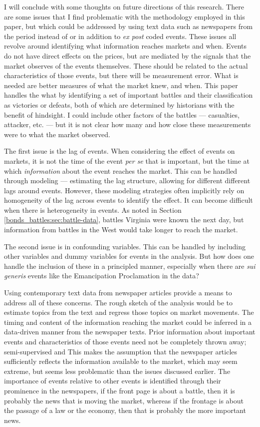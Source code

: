 I will conclude with some thoughts on future directions of this research.
There are some issues that I find problematic with the methodology employed in this paper, but which could be addressed by using text data such as newspapers from the period instead of or in addition to \textit{ex post} coded events.
These issues all revolve around identifying what information reaches markets and when. 
Events do not have direct effects on the prices, but are mediated by the signals that the market observes of the events themselves.
These should be related to the actual characteristics of those events, but there will be measurement error.
What is needed are better measures of what the market knew, and when.
This paper handles the what by identifying a set of important battles and their classification as victories or defeats, both of which are determined by historians with the benefit of hindsight.
I could include other factors of the battles --- casualties, attacker, etc. --- but it is not clear how many and how close these measurements were to what the market observed.

The first issue is the lag of events.
  When considering the effect of events on markets, it is not the time of the event \textit{per se} that is important, but the time at which \textit{information} about the event reaches the market.
  This can be handled through modeling --- \eg{}estimating the lag structure, allowing for different different lags around events.
  However, these modeling strategies often implicitly rely on homogeneity of the lag across events to identify the effect.
  It can become difficult when there is heterogeneity in events.
  As noted in Section \ref{bonds_battles:sec:battle-data}, battles Virginia were known the next day, but information from battles in the West would take longer to reach the market.

The second issue is in confounding variables.
  This can be handled by including other variables and dummy variables for events in the analysis.
  But how does one handle the inclusion of these in a principled manner, especially when there are \textit{sui generis} events like the Emancipation Proclamation in the data?

Using contemporary text data from newspaper articles provide a means to address all of these concerns.
The rough sketch of the analysis would be to estimate topics from the text and regress those topics on market movements.
The timing and content of the information reaching the market could be inferred in a data-driven manner from the newspaper texts.
Prior information about important events and characteristics of those events need not be completely thrown away; 
semi-supervised and 
This makes the assumption that the newspaper articles sufficiently reflects the information available to the market, which may seem extreme, but seems less problematic than the issues discussed earlier.
The importance of events relative to other events is identified through their prominence in the newspapers, \eg{}if the front page is about a battle, then it is probably the news that is moving the market, whereas if the frontage is about the passage of a law or the economy, then that is probably the more important news.


